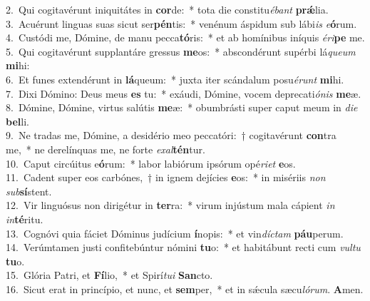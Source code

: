 {2.~}Qui cogitavérunt iniquitátes in \textbf{cor}de:~* tota die constitu\textit{é}\textit{bant} \textbf{prǽ}lia.\\
{3.~}Acuérunt linguas suas sicut ser\textbf{pén}tis:~* venénum áspidum sub lábi\textit{is} \textit{e}\textbf{ó}rum.\\
{4.~}Custódi me, Dómine, de manu pecca\textbf{tó}ris:~* et ab homínibus iníquis \textit{é}\textit{ri}\textbf{pe} me.\\
{5.~}Qui cogitavérunt supplantáre gressus \textbf{me}os:~* abscondérunt supérbi lá\textit{que}\textit{um} \textbf{mi}hi:\\
{6.~}Et funes extendérunt in \textbf{lá}queum:~* juxta iter scándalum posu\textit{é}\textit{runt} \textbf{mi}hi.\\
{7.~}Dixi Dómino: Deus meus \textbf{es} tu:~* exáudi, Dómine, vocem deprecati\textit{ó}\textit{nis} \textbf{me}æ.\\
{8.~}Dómine, Dómine, virtus salútis \textbf{me}æ:~* obumbrásti super caput meum in \textit{di}\textit{e} \textbf{bel}li.\\
{9.~}Ne tradas me, Dómine, a desidério meo peccatóri:~† cogitavérunt \textbf{con}tra me,~* ne derelínquas me, ne forte \textit{e}\textit{xal}\textbf{tén}tur.\\
{10.~}Caput circúitus e\textbf{ó}rum:~* labor labiórum ipsórum opé\textit{ri}\textit{et} \textbf{e}os.\\
{11.~}Cadent super eos carbónes,~† in ignem dejícies \textbf{e}os:~* in misériis \textit{non} \textit{sub}\textbf{sí}stent.\\
{12.~}Vir linguósus non dirigétur in \textbf{ter}ra:~* virum injústum mala cápient \textit{in} \textit{in}\textbf{té}ritu.\\
{13.~}Cognóvi quia fáciet Dóminus judícium \textbf{í}nopis:~* et vin\textit{dí}\textit{ctam} \textbf{páu}perum.\\
{14.~}Verúmtamen justi confitebúntur nómini \textbf{tu}o:~* et habitábunt recti cum \textit{vul}\textit{tu} \textbf{tu}o.\\
{15.~}Glória Patri, et \textbf{Fí}lio,~* et Spirí\textit{tu}\textit{i} \textbf{San}cto.\\
{16.~}Sicut erat in princípio, et nunc, et \textbf{sem}per,~* et in sǽcula sæcu\textit{ló}\textit{rum}. \textbf{A}men.\\
